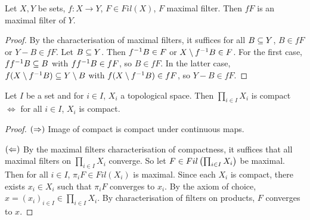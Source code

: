 \documentclass[main.tex]{subfiles}
\begin{document}
\begin{lem} 
  
  Let $X,Y$ be sets, $f : X \to Y$, $F \in Fil(X)$, $F$ maximal filter.
  Then $f F$ is an maximal filter of $Y$. 
\end{lem}
\begin{proof}
  By the characterisation of maximal filters, 
  it suffices for all $B \subseteq Y$, $B \in fF$ or $Y\minus B \in fF$.
  Let $B \subseteq Y$.
  Then $f^{-1} B \in F$ or $X\setminus f^{-1} B \in F$.
  For the first case, $f f^{-1} B \subseteq B$ with $f f^{-1} B \in fF$,
  so $B \in fF$.
  In the latter case, $f(X\setminus f^{-1} B) \subseteq Y\setminus B$ with 
  $f(X\setminus f^{-1} B) \in fF$, so $Y\minus B \in fF$.
\end{proof}

\begin{thm} 
  
  Let $I$ be a set and for $i \in I$, $X_i$ a topological space.
  Then $\prod_{i \in I} X_i$ is compact $\iff$
  for all $i \in I$, $X_i$ is compact. 
\end{thm}
\begin{proof}
  $(\Rightarrow)$ Image of compact is compact under continuous maps.

  $(\Leftarrow)$ By the maximal filters characterisation of compactness,
  it suffices that all maximal filters on $\prod_{i \in I} X_i$ converge.
  So let $F \in Fil\left(\prod_{i \in I} X_i\right)$ be maximal.
  Then for all $i \in I$, $\pi_i F \in Fil(X_i)$ is maximal.
  Since each $X_i$ is compact, 
  there exists $x_i \in X_i$ such that $\pi_i F$ converges to $x_i$.
  By the axiom of choice, 
  $x = (x_i)_{i\in I} \in \prod_{i \in I} X_i$.
  By characterisation of filters on products, 
  $F$ converges to $x$.
\end{proof}
\end{document}
